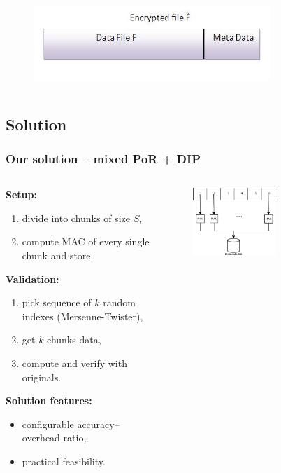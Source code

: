 \documentclass[compress]{beamer}
\begin{document}
\begin{frame}
\begin{columns}
\begin{column}{0.5\textwidth}
\begin{figure}
			\includegraphics[width=0.8\textwidth]{img/dip3.png}
		\end{figure}
	\end{column}
\end{columns}
\end{frame}

\subsection{Solution}
\begin{frame}
\frametitle{\textbf{Our solution -- mixed PoR + DIP}}
\begin{columns}
	\begin{column}{0.5\textwidth}
		\small
		\textbf{Setup:}
		\begin{enumerate}
			\item divide into chunks of size $S$,
			\item compute MAC of every single chunk and store.
		\end{enumerate}
		\textbf{Validation:}
		\begin{enumerate}
			\item pick sequence of $k$ random indexes (Mersenne-Twister),
			\item get $k$ chunks data,
			\item compute and verify with originals.
		\end{enumerate}
		\textbf{Solution features:}
		\begin{itemize}
			\item configurable accuracy--overhead ratio,
			\item practical feasibility.
		\end{itemize}
	\end{column}
	\begin{column}{0.5\textwidth}
		\begin{figure}
			\centering
			\includegraphics[width=0.6\textwidth]{img/solution-setup.png}\\

\end{figure}
\end{column}
\end{columns}
\end{frame}
\end{document}
